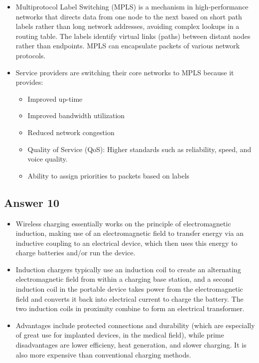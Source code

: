 \documentclass[]{article}
\begin{document}
\begin{itemize}
\itemsep1pt\parskip0pt
\item
  Multiprotocol Label Switching (MPLS) is a mechanism in
  high-performance networks that directs data from one node to the next
  based on short path labels rather than long network addresses,
  avoiding complex lookups in a routing table. The labels identify
  virtual links (paths) between distant nodes rather than endpoints.
  MPLS can encapsulate packets of various network protocols.
\item
  Service providers are switching their core networks to MPLS because it
  provides:

  \begin{itemize}
  \itemsep1pt\parskip0pt
  \item
    Improved up-time
  \item
    Improved bandwidth utilization
  \item
    Reduced network congestion
  \item
    Quality of Service (QoS): Higher standards such as reliability,
    speed, and voice quality.
  \item
    Ability to assign priorities to packets based on labels
  \end{itemize}
\end{itemize}

\subsection{Answer 10}\label{answer-10}

\begin{itemize}
\itemsep1pt\parskip0pt
\item
  Wireless charging essentially works on the principle of
  electromagnetic induction, making use of an electromagnetic field to
  transfer energy via an inductive coupling to an electrical device,
  which then uses this energy to charge batteries and/or run the device.
\item
  Induction chargers typically use an induction coil to create an
  alternating electromagnetic field from within a charging base station,
  and a second induction coil in the portable device takes power from
  the electromagnetic field and converts it back into electrical current
  to charge the battery. The two induction coils in proximity combine to
  form an electrical transformer.
\item
  Advantages include protected connections and durability (which are
  especially of great use for implanted devices, in the medical field),
  while prime disadvantages are lower efficieny, heat generation, and
  slower charging. It is also more expensive than conventional charging
  methods.
\end{itemize}
\end{document}
